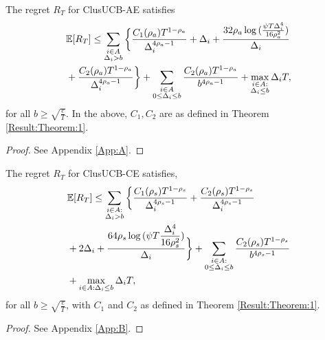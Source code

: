 \begin{proposition}
\label{proofTheorem:Prop:1}
The regret $R_T$ for ClusUCB-AE satisfies
\begin{align*}
&\mathbb{E} [R_{T}]\leq \sum\limits_{\substack{i\in A\\\Delta_{i} > b}}\bigg\lbrace\frac{C_{1}(\rho_{a})T^{1-\rho_{a}}}{\Delta_{i}^{4\rho_{a}-1}} + \Delta_{i}+\frac{32\rho_{a}\log{(\frac{\psi  T\Delta_{i}^{4}}{16\rho_{a}^{2}})}}{\Delta_{i}}\\
& +  \frac{C_{2}(\rho_{a})T^{1-\rho_{a}}}{\Delta_{i}^{4\rho_{a} -1}}  \bigg \rbrace +\sum\limits_{\substack{i\in A\\0\leq\Delta_{i}\leq b}}\frac{C_{2}(\rho_{a})T^{1-\rho_{a}}}{b^{4\rho_{a} -1}}  + \max_{\substack{i\in A: \\ \Delta_{i}\leq b}}\Delta_{i}T,
\end{align*}
for all $b\geq\sqrt{\frac{e}{T}}$. In the above, $C_1, C_2$ are as defined in Theorem \ref{Result:Theorem:1}.
\end{proposition}
\begin{proof}
See Appendix \ref{App:A}.
\end{proof}

\begin{proposition}
\label{proofTheorem:Prop:2}
The regret $R_T$ for ClusUCB-CE satisfies,
\begin{align*}
&\mathbb{E} [R_{T}]\leq \sum\limits_{\substack{i\in A: \\ \Delta_{i} > b}}\bigg\lbrace\dfrac{C_{1}(\rho_{s})T^{1-\rho_{s}}}{\Delta_{i}^{4\rho_{s}-1}} + \dfrac{C_{2}(\rho_{s})T^{1-\rho_{s}}}{\Delta_{i}^{4\rho_{s} -1}} \\
& + 2\Delta_{i}+\dfrac{64\rho_{s}\log{(\psi T\dfrac{\Delta_{i}^{4}}{16\rho_{s}^{2}})}}{\Delta_{i}} \bigg\rbrace 
 + \sum\limits_{\substack{i\in A: \\ 0\leq\Delta_{i}\leq b}}\dfrac{C_{2}(\rho_{s})T^{1-\rho_{s}}}{b^{4\rho_{s} -1}} \\
 & + \max_{i\in A:\Delta_{i}\leq b}\Delta_{i}T,
\end{align*}
 for all $b\geq \sqrt{\frac{e}{T}}$, with $C_1$ and $C_2$ as defined in Theorem \ref{Result:Theorem:1}.
\end{proposition}
\begin{proof}
See Appendix \ref{App:B}.
\end{proof}